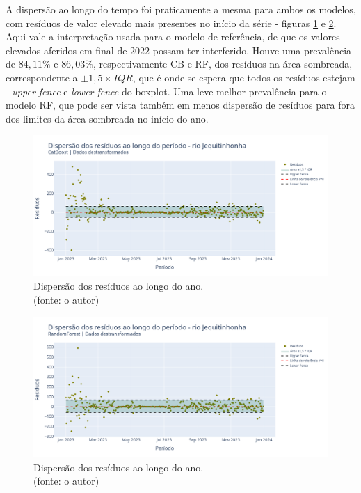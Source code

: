 A dispersão ao longo do tempo foi praticamente a mesma para ambos os modelos, com resíduos de valor elevado mais presentes no início da série - figuras \ref{fig:jequiti_CB_WFV_LOG_RESID_x_TEMPO} e \ref{fig:jequiti_RF_WFV_LOG_RESID_x_TEMPO}. Aqui vale a interpretação usada para o modelo de referência, de que os valores elevados aferidos em final de $2022$ possam ter interferido. Houve uma prevalência de $84,11\%$ e $86,03\%$, respectivamente CB e RF, dos resíduos na área sombreada, correspondente a $\pm 1,5 \times IQR$, que é onde se espera que todos os resíduos estejam - \textit{upper fence} e \textit{lower fence} do boxplot. Uma leve melhor prevalência para o modelo RF, que pode ser vista também em menos dispersão de resíduos para fora dos limites da área sombreada no início do ano.

\begin{figure}[!h]
	\centering
	\includegraphics[scale=0.33]{Figuras/jequiti/wfv/CB/CB_WFV_LOG_RESID_x_TEMPO.png}
	\caption{Dispersão dos resíduos ao longo do ano.\\(fonte: o autor)}
	\label{fig:jequiti_CB_WFV_LOG_RESID_x_TEMPO}
\end{figure}

\begin{figure}[!h]
	\centering
	\includegraphics[scale=0.33]{Figuras/jequiti/wfv/RF/RF_WFV_LOG_RESID_x_TEMPO.png}
	\caption{Dispersão dos resíduos ao longo do ano.\\(fonte: o autor)}
	\label{fig:jequiti_RF_WFV_LOG_RESID_x_TEMPO}
\end{figure}
\clearpage

